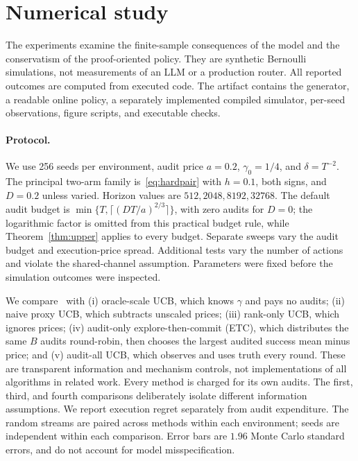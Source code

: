 \section{Numerical study}\label{sec:experiments}
The experiments examine the finite-sample consequences of the model and the conservatism of the proof-oriented policy. They are synthetic Bernoulli simulations, not measurements of an LLM or a production router. All reported outcomes are computed from executed code. The artifact contains the generator, a readable online policy, a separately implemented compiled simulator, per-seed observations, figure scripts, and executable checks.

\paragraph{Protocol.}
We use 256 seeds per environment, audit price $a=0.2$, $\gamma_0=1/4$, and $\delta=T^{-2}$. The principal two-arm family is~\eqref{eq:hardpair} with $h=0.1$, both signs, and $D=0.2$ unless varied. Horizon values are $512,2048,8192,32768$. The default audit budget is $\min\{T,\lceil(DT/a)^{2/3}\rceil\}$, with zero audits for $D=0$; the logarithmic factor is omitted from this practical budget rule, while Theorem~\ref{thm:upper} applies to every budget. Separate sweeps vary the audit budget and execution-price spread. Additional tests vary the number of actions and violate the shared-channel assumption. Parameters were fixed before the simulation outcomes were inspected.

We compare \SC\ with (i) oracle-scale UCB, which knows $\gamma$ and pays no audits; (ii) naive proxy UCB, which subtracts unscaled prices; (iii) rank-only UCB, which ignores prices; (iv) audit-only explore-then-commit (ETC), which distributes the same $B$ audits round-robin, then chooses the largest audited success mean minus price; and (v) audit-all UCB, which observes and uses truth every round. These are transparent information and mechanism controls, not implementations of all algorithms in related work. Every method is charged for its own audits. The first, third, and fourth comparisons deliberately isolate different information assumptions. We report execution regret separately from audit expenditure. The random streams are paired across methods within each environment; seeds are independent within each comparison. Error bars are $1.96$ Monte Carlo standard errors, and do not account for model misspecification.

\begin{table}[t]
\centering\small
\caption{At $T=32768$, $D=0.2$, $h=0.1$, and $a=0.2$, empirical regret over 256 seeds (mean $\pm$ one Monte Carlo standard error). \SC\ and audit-only ETC each use 1024 audits. Oracle-scale UCB receives the true scale. Audit-all UCB pays for 32768 audits.}\label{tab:results}

\end{table}

